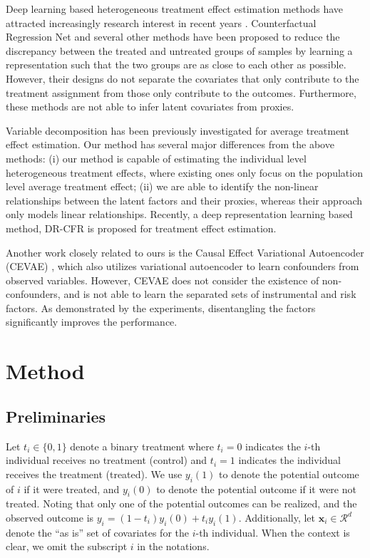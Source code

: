 \documentclass[letterpaper]{article} %
\begin{document}
Deep learning based heterogeneous treatment effect estimation methods have attracted increasingly research interest in recent years \cite{Shalit2016,Alaa2018,Louizos2017,Hassanpour2018,Yao2018_Twin,Yoon2018}.
Counterfactual Regression Net \cite{Shalit2016} and several other methods \cite{Yao2018_Twin,Hassanpour2018} have been proposed to reduce the discrepancy between the treated and untreated groups of samples by learning a representation such that the two groups are as close to each other as possible.
However, their designs do not separate the covariates that only contribute to the treatment assignment from those only contribute to the outcomes. Furthermore, these methods are not able to infer latent covariates from proxies.

Variable decomposition \cite{Kun2017,Haeggstroem2017} has been previously investigated for average treatment effect estimation.
Our method has several major differences from the above methods: (i) our method is capable of estimating the individual level heterogeneous treatment effects, where existing ones only focus on the population level average treatment effect; (ii) we are able to identify the non-linear relationships between the latent factors and their proxies, whereas their approach only models linear relationships. Recently, a deep representation learning based method, DR-CFR \cite{Hassanpour2020} is proposed for treatment effect estimation.

Another work closely related to ours is the Causal Effect Variational Autoencoder (CEVAE) \cite{Louizos2017}, which also utilizes variational autoencoder to learn confounders from observed variables. However, CEVAE does not consider the existence of non-confounders, and is not able to learn the separated sets of instrumental and risk factors.
As demonstrated by the experiments, disentangling the factors significantly improves the performance.



\section*{Method}

\subsection*{Preliminaries}
Let $t_i \in \{0,1\}$ denote a binary treatment where $t_i = 0$ indicates the $i$-th individual receives no treatment (control) and $t_i = 1$ indicates the individual receives the treatment (treated). We use $y_i(1)$ to denote the potential outcome of $i$ if it were treated, and $y_i(0)$ to denote the potential outcome if it were not treated. Noting that only one of the potential outcomes can be realized, and the observed outcome is $y_i = (1-t_i)y_i(0) + t_i y_i(1)$. Additionally, let $\mathbf{x}_i \in \mathcal{R}^d$ denote the ``as is'' set of covariates for the $i$-th individual. When the context is clear, we omit the subscript $i$ in the notations.
\end{document}
